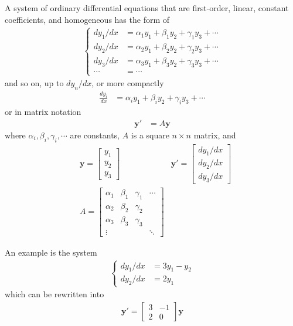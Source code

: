 \begin{defn}
A system of ordinary differential equations that are first-order, linear, constant coefficients, and homogeneous has the form of
\begin{align*}
\begin{cases}
dy_1/dx &= \alpha_1 y_1 + \beta_1 y_2 + \gamma_1 y_3 + \cdots \\
dy_2/dx &= \alpha_2 y_1 + \beta_2 y_2 + \gamma_2 y_3 + \cdots \\
dy_3/dx &= \alpha_3 y_1 + \beta_3 y_2 + \gamma_3 y_3 + \cdots \\
\cdots &= \cdots
\end{cases}
\end{align*}
and so on, up to $dy_n/dx$, or more compactly
\begin{align*}
\frac{dy_i}{dx} &= \alpha_i y_1 + \beta_i y_2 + \gamma_i y_3 + \cdots
\end{align*}
or in matrix notation
\begin{align*}
\textbf{y}' &= A\textbf{y}
\end{align*}
where $\alpha_i, \beta_i, \gamma_i, \cdots$ are constants, $A$ is a square $n \times n$ matrix, and
\begin{align*}
&\textbf{y} =
\begin{bmatrix}
y_1 \\
y_2 \\
y_3
\end{bmatrix}
&\textbf{y}' =
\begin{bmatrix}
dy_1/dx \\
dy_2/dx \\
dy_3/dx
\end{bmatrix} \\
&A=
\begin{bmatrix}
\alpha_1 & \beta_1 & \gamma_1 & \cdots \\
\alpha_2 & \beta_2 & \gamma_2 & \\
\alpha_3 & \beta_3 & \gamma_3 &  \\
\vdots & & & \ddots
\end{bmatrix}
\end{align*}
\end{defn}
An example is the system
\begin{align*}
\begin{cases}
dy_1/dx &= 3y_1 - y_2 \\
dy_2/dx &= 2y_1
\end{cases} 
\end{align*}
which can be rewritten into
\begin{align*}
\textbf{y}' =
\begin{bmatrix}
3 & -1 \\
2 & 0
\end{bmatrix}
\textbf{y}
\end{align*}

